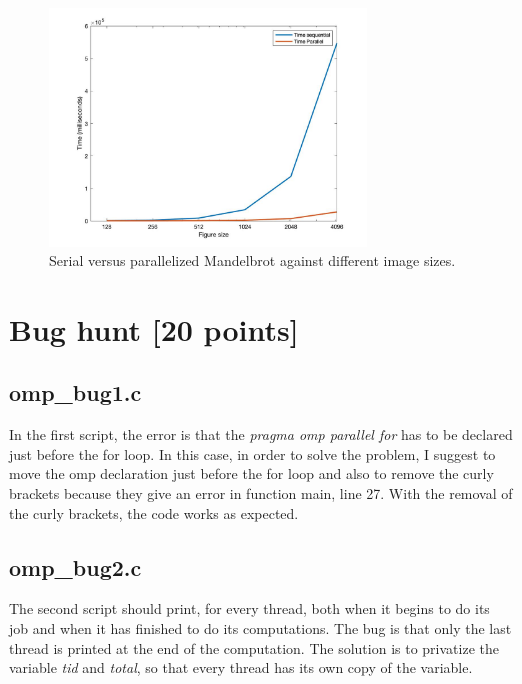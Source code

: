 \documentclass[unicode,11pt,a4paper,oneside,numbers=endperiod,openany]{scrartcl}
\begin{document}
\begin{figure}[h]
\centering
\includegraphics[width=0.75\textwidth]{Figures/timing_mandelbrot.jpg}
\caption{Serial versus parallelized Mandelbrot against different image sizes.}\label{fig:mandelbrot}
\end{figure}



\section{Bug hunt [20 points]}
\subsection{omp\_bug1.c}
In the first script, the error is that the \textit{pragma omp parallel for} has to be declared just before the for loop. In this case, in order to solve the problem, I suggest to move the omp declaration just before the for loop and also to remove the curly brackets because they give an error in function main, line 27. With the removal of the curly brackets, the code works as expected.\\



\subsection{omp\_bug2.c}
The second script should print, for every thread, both when it begins to do its job and when it has finished to do its computations. The bug is that only the last thread is printed at the end of the computation. The solution is to privatize the variable \textit{tid} and \textit{total}, so that every thread has its own copy of the variable.\\
\end{document}
